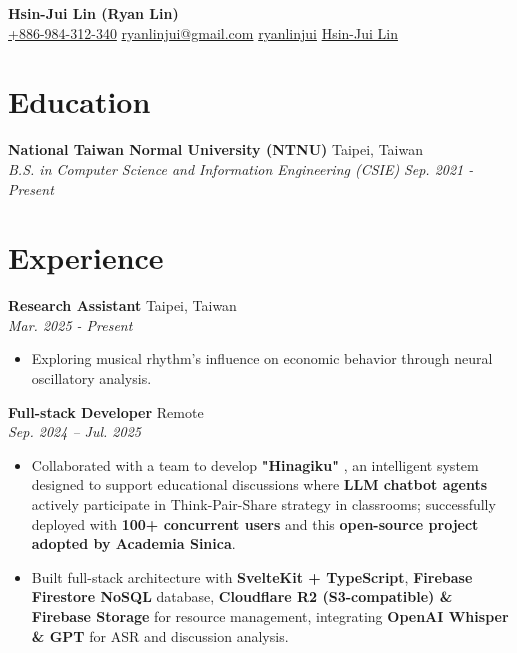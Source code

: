 \documentclass[a4paper,11pt]{article}
\newcommand{\makeheader}[5]{
    \begin{center}
        {\fontsize{18}{30}\selectfont\mdseries\ttfamily\bfseries\color{namecolor} #1}\\[0.25em]
        {\footnotesize
            \href{tel:#2}{\color{textcolor}\raisebox{-1pt}{} #2} \quad
            \href{mailto:#3}{\color{textcolor}\raisebox{-1pt}{} #3} \quad
            \href{https://github.com/#4}{\color{textcolor}\raisebox{-2pt}{} #4} \quad
            \href{https://linkedin.com/in/#4}{\color{textcolor}\raisebox{-1.5pt}{} #5}
        }
    \end{center}
    \vspace{-2em}
}
\begin{document}
\makeheader{Hsin-Jui Lin (Ryan Lin)}{+886-984-312-340}{ryanlinjui@gmail.com}{ryanlinjui}{Hsin-Jui Lin}

\section{Education}
\noindent \textbf{National Taiwan Normal University (NTNU)} \hfill Taipei, Taiwan\\
\textit{B.S. in Computer Science and Information Engineering (CSIE)} \hfill \textit{Sep. 2021 - Present}

\section{Experience}
\noindent \textbf{Research Assistant} \hfill Taipei, Taiwan\\
 \hfill \textit{Mar. 2025 - Present}
\begin{itemize}
    \item Exploring musical rhythm's influence on economic behavior through neural oscillatory analysis.
\end{itemize}
\vspace{0.25em}

\noindent \textbf{Full-stack Developer} \hfill Remote\\
 \hfill \textit{Sep. 2024 -- Jul. 2025}
\begin{itemize}
    \item Collaborated with a team to develop \textbf{"Hinagiku"} \href{https://hinagiku-dev.vercel.app}{\color{textcolor}\raisebox{0pt}{}}, an intelligent system designed to support educational discussions where \textbf{LLM chatbot agents} actively participate in Think-Pair-Share strategy in classrooms; successfully deployed with \textbf{100+ concurrent users} and this \textbf{open-source project adopted by Academia Sinica}.
    \item Built full-stack architecture with \textbf{SvelteKit + TypeScript}, \textbf{Firebase Firestore NoSQL} database, \textbf{Cloudflare R2 (S3-compatible) \& Firebase Storage} for resource management, integrating \textbf{OpenAI Whisper \& GPT} for ASR and discussion analysis.
\end{itemize}
\vspace{0.25em}
\end{document}
